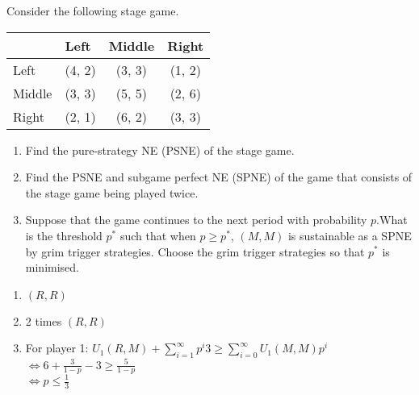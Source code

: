 \documentclass[../main.tex]{subfiles}
\begin{document}
\begin{question}
  Consider the following stage game.
    \begin{table}[h]
    \centering
\begin{tabular}{lccc}
                            & \multicolumn{1}{l}{Left} & \multicolumn{1}{l}{Middle} & \multicolumn{1}{l}{Right} \\ \hline
\multicolumn{1}{l|}{Left}   & (4, 2)                   & (3, 3)                     & (1, 2)                    \\
\multicolumn{1}{l|}{Middle} & (3, 3)                   & (5, 5)                     & (2, 6)                    \\
\multicolumn{1}{l|}{Right}  & (2, 1)                   & (6, 2)                     & (3, 3)                   
\end{tabular}
\end{table}

\begin{enumerate}
  \item Find the pure-strategy NE (PSNE) of the stage game.
  \item Find the PSNE and subgame perfect NE (SPNE) of the game that consists of the stage game being played twice.
  \item Suppose that the game continues to the next period with probability $p$.What is the threshold $p^*$ such that when $p \geq p^*$, $(M,M)$ is sustainable as a SPNE by grim trigger strategies. Choose the grim trigger strategies so that $p^*$ is minimised.
\end{enumerate}

\end{question}

\begin{solution}

\begin{enumerate}
  \item $(R,R)$
  \item 2 times $(R,R)$
  \item For player 1:
$U_1 (R,M) + \sum\limits_{i=1}^{\infty} p^i 3 \geq \sum\limits_{i=0}^{\infty} U_1 (M,M) p^i$\\
$\Leftrightarrow 6 + \frac{3}{1-p} - 3 \geq \frac{5}{1-p}$\\
$\Leftrightarrow p \leq \frac{1}{3}$

\end{enumerate}

\end{solution}
\end{document}
